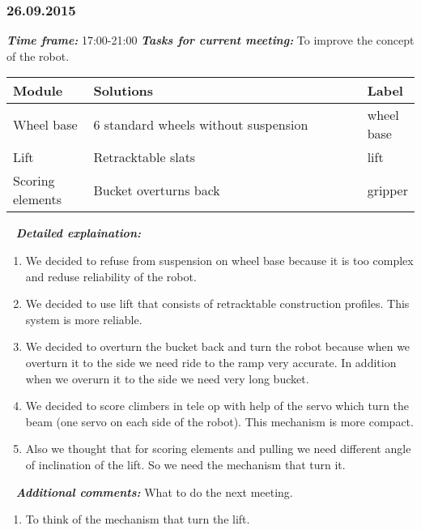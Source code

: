 \subsubsection{26.09.2015}
	\textit{\textbf{Time frame:}} 17:00-21:00 \newline \newline
	\textit{\textbf{Tasks for current meeting:}} To improve the concept of the robot.

  \begin{table}[H]
	\vspace{-2mm}
	\begin{center}
		\begin{tabular}{|p{0.2\linewidth}|p{0.7\linewidth}|p{0.1\linewidth}|}
			\hline
			Module & Solutions & Label \\
			\hline
			Wheel base & 6 standard wheels without suspension & wheel base \\
			\hline
			Lift & Retracktable slats & lift \\
			\hline
			Scoring elements & Bucket overturns back & gripper \\
		\end{tabular}
	\end{center}
  \end{table}
  
   \newline
  \textit{\textbf{Detailed explaination:}}
  \begin{enumerate}
  	\item We decided to refuse from suspension on wheel base because it is too complex and reduse reliability of the robot.
  	
  	\item We decided to use lift that consists of retracktable construction profiles. This system is more reliable.
  	
  	\item We decided to overturn the bucket back and turn the robot because when we overturn it to the side we need ride to the ramp very accurate. In addition when we overurn it to the side we need very long bucket. 
  	
  	\item We decided to score climbers in tele op with help of the servo which turn the beam (one servo on each side of the robot). This mechanism is more compact.
  	
  	\item Also we thought that for scoring elements and pulling we need different angle of inclination of the lift. So we need the mechanism that turn it.
  	
  \end{enumerate}
  
   \newline
  \textit{\textbf{Additional comments:}} What to do the next meeting.
  \begin{enumerate}
  	\item To think of the mechanism that turn the lift.
  \end{enumerate}
  
    \newline

\fillpage

